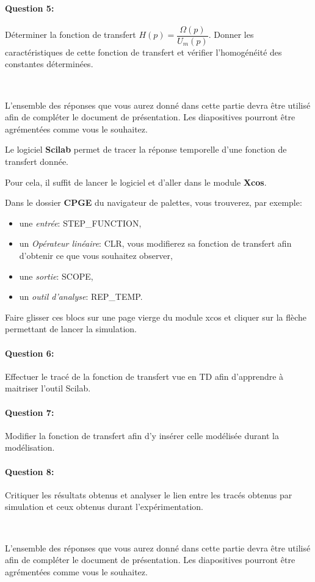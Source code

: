 \paragraph{Question 5:} Déterminer la fonction de transfert $H(p)=\dfrac{\Omega(p)}{U_m(p)}$. Donner les caractéristiques de cette fonction de transfert et vérifier l'homogénéité des constantes déterminées.

~\

L'ensemble des réponses que vous aurez donné dans cette partie devra être utilisé afin de compléter le document de présentation. Les diapositives pourront être agrémentées comme vous le souhaitez.

\ifdef{\public}{\cleardoublepage}{\newpage}


Le logiciel \textbf{Scilab} permet de tracer la réponse temporelle d'une fonction de transfert donnée.

Pour cela, il suffit de lancer le logiciel et d'aller dans le module \textbf{Xcos}.

Dans le dossier \textbf{CPGE} du navigateur de palettes, vous trouverez, par exemple:
\begin{itemize}
 \item une \textit{entrée}: STEP\_FUNCTION,
 \item un \textit{Opérateur linéaire}: CLR, vous modifierez sa fonction de transfert afin d'obtenir ce que vous souhaitez observer,
 \item une \textit{sortie}: SCOPE,
 \item un \textit{outil d'analyse}: REP\_TEMP.
\end{itemize}

Faire glisser ces blocs sur une page vierge du module xcos et cliquer sur la flèche permettant de lancer la simulation.

\paragraph{Question 6:} Effectuer le tracé de la fonction de transfert vue en TD afin d'apprendre à maitriser l'outil Scilab.

\paragraph{Question 7:} Modifier la fonction de transfert afin d'y insérer celle modélisée durant la modélisation.

\paragraph{Question 8:} Critiquer les résultats obtenus et analyser le lien entre les tracés obtenus par simulation et ceux obtenus durant l'expérimentation.

~\

L'ensemble des réponses que vous aurez donné dans cette partie devra être utilisé afin de compléter le document de présentation. Les diapositives pourront être agrémentées comme vous le souhaitez.

\ifdef{\public}{}{}

\newpage

\pagestyle{correction}\setcounter{section}{0}

